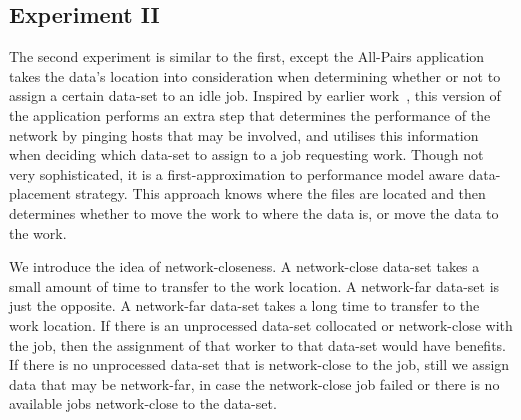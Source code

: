 \documentclass{rspublic}
\begin{document}
\subsection{Experiment II} The second experiment is similar to the
first, except the All-Pairs application takes the data's location into
consideration when determining whether or not to assign a certain
data-set to an idle job.  Inspired by earlier work~\citep{netperf},
this version of the application performs an extra step that determines
the performance of the network by pinging hosts that may be involved,
and utilises this information when deciding which data-set to assign
to a job requesting work.  Though not very sophisticated, it is a
first-approximation to performance model aware data-placement strategy.
This approach knows where the files are located and then determines
whether to move the work to where the data is, or move the data to the
work.  

We introduce the idea of network-closeness.  A network-close data-set
takes a small amount of time to transfer to the work location.  A
network-far data-set is just the opposite.  A network-far data-set takes
a long time to transfer to the work location.  If there is an
unprocessed data-set collocated or network-close with the job, then the
assignment of that worker to that data-set would have benefits.  If
there is no unprocessed data-set that is network-close to the job, still
we assign data that may be network-far, in case the network-close job
failed or there is no available jobs network-close to the data-set.

\end{document}
